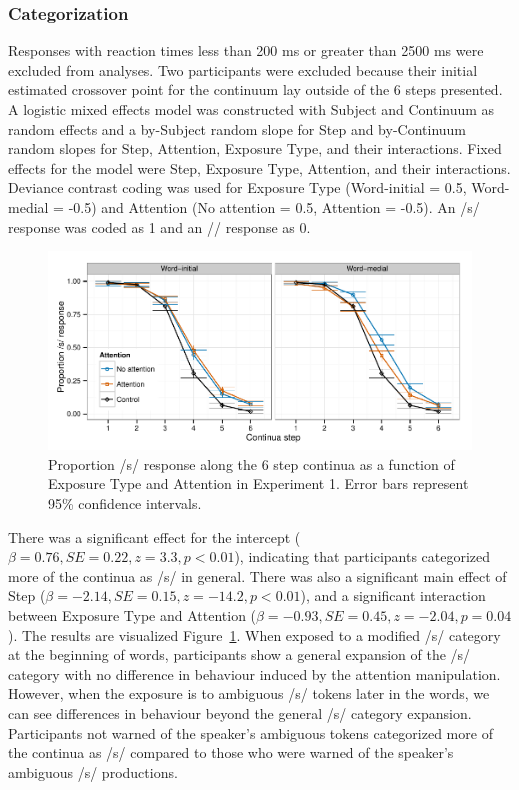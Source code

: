 \subsubsection{Categorization}

Responses with reaction times less than 200 ms or greater than 2500 ms were excluded from analyses. 
Two participants were excluded because their initial estimated crossover point for the continuum lay outside of the 6 steps presented.  
A logistic mixed effects model was constructed with Subject and Continuum as random effects and a by-Subject random slope for Step and by-Continuum random slopes for Step, Attention, Exposure Type, and their interactions. 
Fixed effects for the model were Step, Exposure Type, Attention, and their interactions.  
Deviance contrast coding was used for Exposure Type (Word-initial = 0.5, Word-medial = -0.5) and Attention (No attention = 0.5, Attention = -0.5).
An /s/ response was coded as 1 and an /\textesh/ response as 0.

\begin{figure}[!ht]
\caption{Proportion /s/ response along the 6 step continua as a function of Exposure Type and Attention in Experiment 1.    Error bars represent 95\% confidence intervals.}
\label{fig:exp1categ}
\begin{center}
\includegraphics[width=\textwidth]{graphs/exp1_categresults}
\end{center}
\end{figure}

There was a significant effect for the intercept ($\beta = 0.76, SE = 0.22, z = 3.3, p < 0.01$), indicating that participants categorized more of the continua as /s/ in general.  
There was also a significant main effect of Step ($\beta = -2.14, SE = 0.15, z = -14.2, p < 0.01$), and a significant interaction between Exposure Type and Attention ($\beta = -0.93, SE = 0.45, z = -2.04, p = 0.04$).  The results are visualized Figure~\ref{fig:exp1categ}.
When exposed to a modified /s/ category at the beginning of words, participants show a general expansion of the /s/ category with no difference in behaviour induced by the attention manipulation.  
However, when the exposure is to ambiguous /s/ tokens later in the words, we can see differences in behaviour beyond the general /s/ category expansion.  
Participants not warned of the speaker's ambiguous tokens categorized more of the continua as /s/ compared to those who were warned of the speaker's ambiguous /s/ productions.

